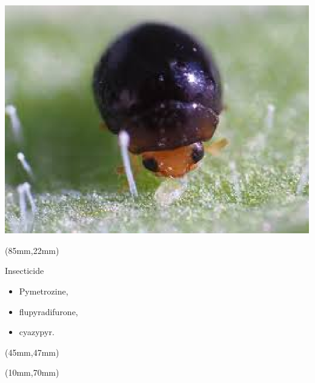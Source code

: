 \begin{frame}
{\begin{textblock*}{40mm}
			\includegraphics[width=\linewidth]{Feathergraphics/mariquita.eps}
		\end{textblock*}
	}
	{
		\begin{textblock*}{42mm}(85mm,22mm)
			\begin{graybox}{\textcolor{redstrong}{Insecticide}}
				\begin{itemize}
					\item<8-> Pymetrozine,
					\item<9-> flupyradifurone,
					\item<10-> cyazypyr.
				\end{itemize}
			\end{graybox}
		\end{textblock*}
	}
	{
		\begin{textblock*}{90mm}(45mm,47mm)	
			\begin{bibunit}[abbrv]
				\nocite{Shun-xiang2001}
				\putbib
			\end{bibunit}
		\end{textblock*}
		
		\begin{textblock*}{120mm}(10mm,70mm)
			
			\begin{bibunit}[abbrv]
				\nocite{Smith2014}
				\putbib
			\end{bibunit}
		\end{textblock*}
	}

\end{frame}
